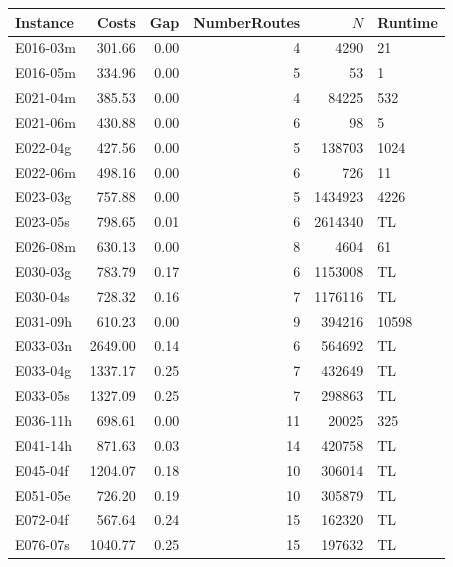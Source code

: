 \begin{table}
    \centering
    \begin{tabular}{lrrrrl}
        \toprule
        Instance & Costs   & Gap  & NumberRoutes & $N$     & Runtime \\
        \midrule
        E016-03m & 301.66  & 0.00 & 4            & 4290    & 21      \\
        E016-05m & 334.96  & 0.00 & 5            & 53      & 1       \\
        E021-04m & 385.53  & 0.00 & 4            & 84225   & 532     \\
        E021-06m & 430.88  & 0.00 & 6            & 98      & 5       \\
        E022-04g & 427.56  & 0.00 & 5            & 138703  & 1024    \\
        E022-06m & 498.16  & 0.00 & 6            & 726     & 11      \\
        E023-03g & 757.88  & 0.00 & 5            & 1434923 & 4226    \\
        E023-05s & 798.65  & 0.01 & 6            & 2614340 & TL      \\
        E026-08m & 630.13  & 0.00 & 8            & 4604    & 61      \\
        E030-03g & 783.79  & 0.17 & 6            & 1153008 & TL      \\
        E030-04s & 728.32  & 0.16 & 7            & 1176116 & TL      \\
        E031-09h & 610.23  & 0.00 & 9            & 394216  & 10598   \\
        E033-03n & 2649.00 & 0.14 & 6            & 564692  & TL      \\
        E033-04g & 1337.17 & 0.25 & 7            & 432649  & TL      \\
        E033-05s & 1327.09 & 0.25 & 7            & 298863  & TL      \\
        E036-11h & 698.61  & 0.00 & 11           & 20025   & 325     \\
        E041-14h & 871.63  & 0.03 & 14           & 420758  & TL      \\
        E045-04f & 1204.07 & 0.18 & 10           & 306014  & TL      \\
        E051-05e & 726.20  & 0.19 & 10           & 305879  & TL      \\
        E072-04f & 567.64  & 0.24 & 15           & 162320  & TL      \\
        E076-07s & 1040.77 & 0.25 & 15           & 197632  & TL      \\

\end{tabular}
\end{table}
